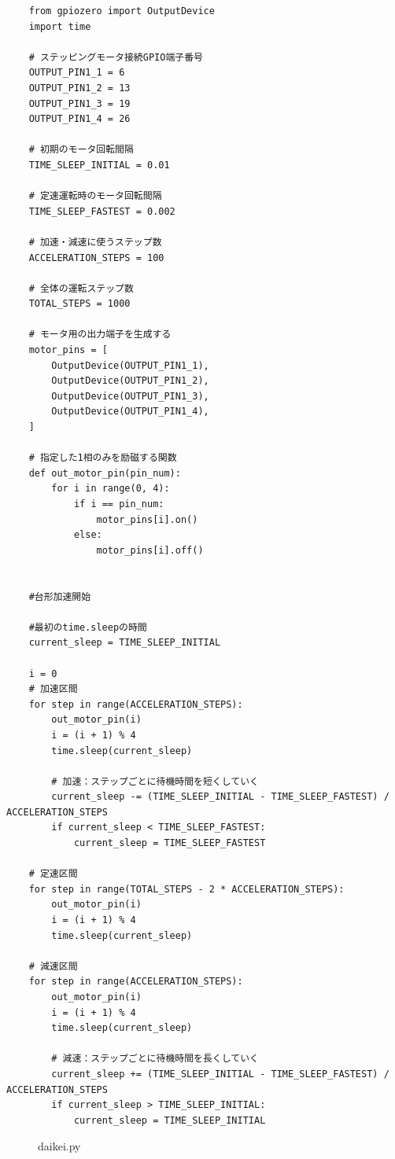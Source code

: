 \documentclass{ltjsarticle} %
\begin{document}
\begin{mdframed}
  \begin{verbatim}
    from gpiozero import OutputDevice
    import time
    
    # ステッピングモータ接続GPIO端⼦番号
    OUTPUT_PIN1_1 = 6
    OUTPUT_PIN1_2 = 13
    OUTPUT_PIN1_3 = 19
    OUTPUT_PIN1_4 = 26
    
    # 初期のモータ回転間隔
    TIME_SLEEP_INITIAL = 0.01
    
    # 定速運転時のモータ回転間隔
    TIME_SLEEP_FASTEST = 0.002
    
    # 加速・減速に使うステップ数
    ACCELERATION_STEPS = 100
    
    # 全体の運転ステップ数
    TOTAL_STEPS = 1000
    
    # モータ⽤の出⼒端⼦を⽣成する
    motor_pins = [
        OutputDevice(OUTPUT_PIN1_1),
        OutputDevice(OUTPUT_PIN1_2),
        OutputDevice(OUTPUT_PIN1_3),
        OutputDevice(OUTPUT_PIN1_4),
    ]
    
    # 指定した1相のみを励磁する関数
    def out_motor_pin(pin_num):
        for i in range(0, 4):
            if i == pin_num:
                motor_pins[i].on()
            else:
                motor_pins[i].off()
    
    
    #台形加速開始
    
    #最初のtime.sleepの時間
    current_sleep = TIME_SLEEP_INITIAL
    
    i = 0
    # 加速区間
    for step in range(ACCELERATION_STEPS):
        out_motor_pin(i)
        i = (i + 1) % 4
        time.sleep(current_sleep)
        
        # 加速：ステップごとに待機時間を短くしていく
        current_sleep -= (TIME_SLEEP_INITIAL - TIME_SLEEP_FASTEST) / ACCELERATION_STEPS
        if current_sleep < TIME_SLEEP_FASTEST:
            current_sleep = TIME_SLEEP_FASTEST
    
    # 定速区間
    for step in range(TOTAL_STEPS - 2 * ACCELERATION_STEPS):
        out_motor_pin(i)
        i = (i + 1) % 4
        time.sleep(current_sleep)
    
    # 減速区間
    for step in range(ACCELERATION_STEPS):
        out_motor_pin(i)
        i = (i + 1) % 4
        time.sleep(current_sleep)
        
        # 減速：ステップごとに待機時間を長くしていく
        current_sleep += (TIME_SLEEP_INITIAL - TIME_SLEEP_FASTEST) / ACCELERATION_STEPS
        if current_sleep > TIME_SLEEP_INITIAL:
            current_sleep = TIME_SLEEP_INITIAL	
  \end{verbatim}
\end{mdframed}
\begin{figure}[H]
  \caption{daikei.py}
  \label{fig:daikeipy}
\end{figure}
\end{document}
